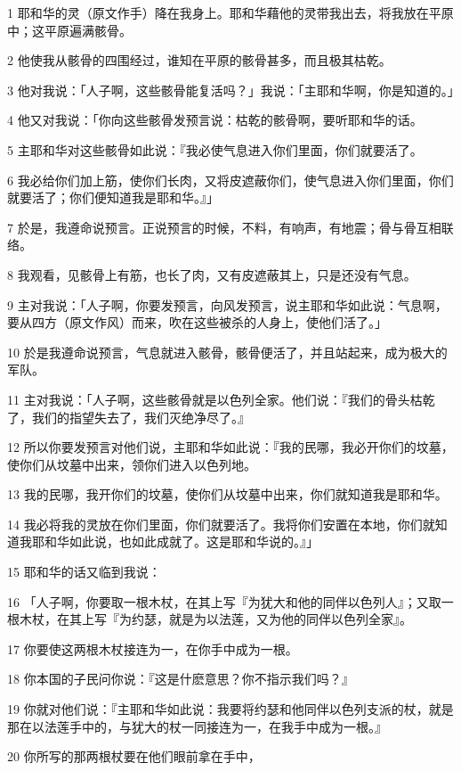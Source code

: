 \par 1 耶和华的灵（原文作手）降在我身上。耶和华藉他的灵带我出去，将我放在平原中；这平原遍满骸骨。
\par 2 他使我从骸骨的四围经过，谁知在平原的骸骨甚多，而且极其枯乾。
\par 3 他对我说：「人子啊，这些骸骨能复活吗？」我说：「主耶和华啊，你是知道的。」
\par 4 他又对我说：「你向这些骸骨发预言说：枯乾的骸骨啊，要听耶和华的话。
\par 5 主耶和华对这些骸骨如此说：『我必使气息进入你们里面，你们就要活了。
\par 6 我必给你们加上筋，使你们长肉，又将皮遮蔽你们，使气息进入你们里面，你们就要活了；你们便知道我是耶和华。』」
\par 7 於是，我遵命说预言。正说预言的时候，不料，有响声，有地震；骨与骨互相联络。
\par 8 我观看，见骸骨上有筋，也长了肉，又有皮遮蔽其上，只是还没有气息。
\par 9 主对我说：「人子啊，你要发预言，向风发预言，说主耶和华如此说：气息啊，要从四方（原文作风）而来，吹在这些被杀的人身上，使他们活了。」
\par 10 於是我遵命说预言，气息就进入骸骨，骸骨便活了，并且站起来，成为极大的军队。
\par 11 主对我说：「人子啊，这些骸骨就是以色列全家。他们说：『我们的骨头枯乾了，我们的指望失去了，我们灭绝净尽了。』
\par 12 所以你要发预言对他们说，主耶和华如此说：『我的民哪，我必开你们的坟墓，使你们从坟墓中出来，领你们进入以色列地。
\par 13 我的民哪，我开你们的坟墓，使你们从坟墓中出来，你们就知道我是耶和华。
\par 14 我必将我的灵放在你们里面，你们就要活了。我将你们安置在本地，你们就知道我耶和华如此说，也如此成就了。这是耶和华说的。』」
\par 15 耶和华的话又临到我说：
\par 16 「人子啊，你要取一根木杖，在其上写『为犹大和他的同伴以色列人』；又取一根木杖，在其上写『为约瑟，就是为以法莲，又为他的同伴以色列全家』。
\par 17 你要使这两根木杖接连为一，在你手中成为一根。
\par 18 你本国的子民问你说：『这是什麽意思？你不指示我们吗？』
\par 19 你就对他们说：『主耶和华如此说：我要将约瑟和他同伴以色列支派的杖，就是那在以法莲手中的，与犹大的杖一同接连为一，在我手中成为一根。』
\par 20 你所写的那两根杖要在他们眼前拿在手中，
